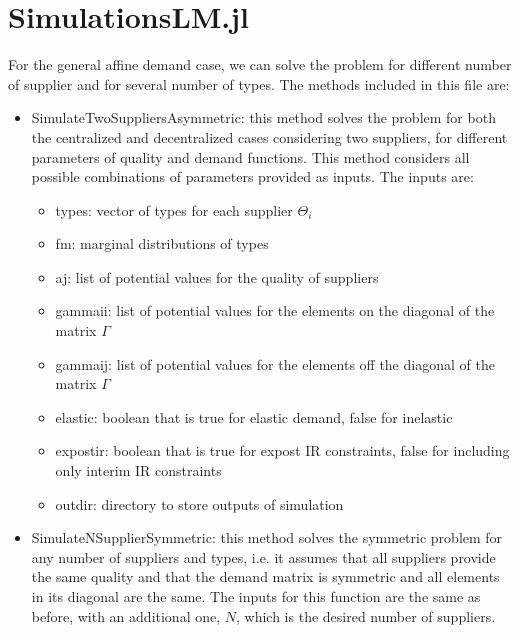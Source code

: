 \documentclass[11pt, oneside]{article}
\begin{document}
\section{SimulationsLM.jl}
For the general affine demand case, we can solve the problem for different number of
supplier and for several number of types. The methods included in this file are:
\begin{itemize}
    \item SimulateTwoSuppliersAsymmetric: this method solves the problem for both
    the centralized and decentralized cases considering two suppliers, for different parameters of quality and
    demand functions. This method considers all possible combinations of parameters provided as inputs. The inputs
    are:
    \begin{itemize}
        \item types: vector of types for each supplier \(\Theta_i\)
        \item fm: marginal distributions of types
        \item aj: list of potential values for the quality of suppliers
        \item gammaii: list of potential values for the elements on the diagonal of the matrix \(\Gamma\)
        \item gammaij: list of potential values for the elements off the diagonal of the matrix \(\Gamma\)
        \item elastic: boolean that is true for elastic demand, false for inelastic
        \item expostir: boolean that is true for expost IR constraints, false for including only interim IR constraints
        \item outdir: directory to store outputs of simulation
    \end{itemize}

    \item SimulateNSupplierSymmetric: this method solves the symmetric problem for any number of
    suppliers and types, i.e. it assumes that all suppliers provide the same quality and that the
    demand matrix is symmetric and all elements in its diagonal are the same. The inputs for this
    function are the same as before, with an additional one, \(N\), which is the desired number of
    suppliers.
\end{itemize}
\end{document}
